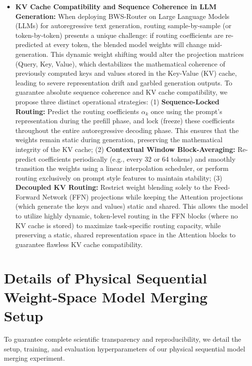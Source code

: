 \begin{itemize}
    \item \textbf{KV Cache Compatibility and Sequence Coherence in LLM Generation:} When deploying BWS-Router on Large Language Models (LLMs) for autoregressive text generation, routing sample-by-sample (or token-by-token) presents a unique challenge: if routing coefficients are re-predicted at every token, the blended model weights will change mid-generation. This dynamic weight shifting would alter the projection matrices (Query, Key, Value), which destabilizes the mathematical coherence of previously computed keys and values stored in the Key-Value (KV) cache, leading to severe representation drift and garbled generation outputs. To guarantee absolute sequence coherence and KV cache compatibility, we propose three distinct operational strategies: (1) \textbf{Sequence-Locked Routing:} Predict the routing coefficients $\alpha_k$ once using the prompt's representation during the prefill phase, and lock (freeze) these coefficients throughout the entire autoregressive decoding phase. This ensures that the weights remain static during generation, preserving the mathematical integrity of the KV cache; (2) \textbf{Contextual Window Block-Averaging:} Re-predict coefficients periodically (e.g., every 32 or 64 tokens) and smoothly transition the weights using a linear interpolation scheduler, or perform routing exclusively on prompt style features to maintain stability; (3) \textbf{Decoupled KV Routing:} Restrict weight blending solely to the Feed-Forward Network (FFN) projections while keeping the Attention projections (which generate the keys and values) static and shared. This allows the model to utilize highly dynamic, token-level routing in the FFN blocks (where no KV cache is stored) to maximize task-specific routing capacity, while preserving a static, shared representation space in the Attention blocks to guarantee flawless KV cache compatibility.
\end{itemize}

\section{Details of Physical Sequential Weight-Space Model Merging Setup}
\label{app:physical_setup}
To guarantee complete scientific transparency and reproducibility, we detail the setup, training, and evaluation hyperparameters of our physical sequential model merging experiment.

